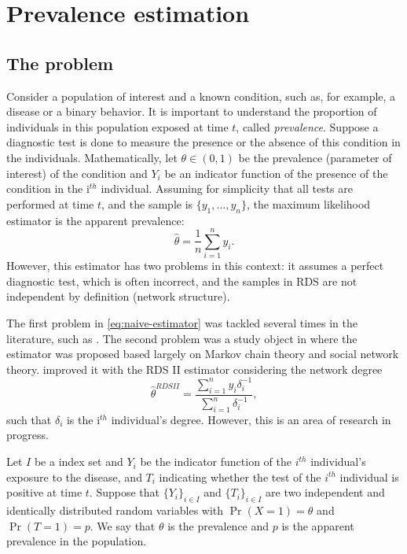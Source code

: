 \chapter{Prevalence estimation}

\section{The problem}

Consider a population of interest and a known condition, such as, for example,
a disease or a binary behavior. It is important to understand the proportion
of individuals in this population exposed at time $t$, called {\em
prevalence}. Suppose a diagnostic test is done to measure the presence or the
absence of this condition in the individuals. Mathematically, let $\theta \in
(0,1)$ be the prevalence (parameter of interest) of the condition and $Y_i$ be an indicator function of the presence of the condition in the i$^{th}$ individual.
Assuming for simplicity that all tests are performed at time $t$, and the
sample is $\{y_1, ..., y_n\}$, the maximum likelihood estimator is the
apparent prevalence: 
\begin{equation}
    \label{eq:naive-estimator}
    \hat{\theta} = \frac{1}{n}\sum_{i=1}^n y_i.
\end{equation}
However, this estimator has two problems in this context: it assumes a perfect
diagnostic test, which is often incorrect, and the samples in RDS are not
independent by definition (network structure). 

The first problem in \eqref{eq:naive-estimator} was tackled several times in
the literature, such as \cite{mcinturff2004modelling}. The second problem was a study object in \cite{heckathorn1997,heckathorn2002} where the estimator was proposed
based largely on Markov chain theory and social network theory.
\cite{volz2008probability} improved it with the RDS II estimator considering
the network degree
\begin{equation}
    \hat{\theta}^{RDS II} = \frac{\sum_{i=1}^n y_i \delta_i^{-1}}{\sum_{i=1}^n \delta_i^{-1}},
\end{equation}
such that $\delta_i$ is the i$^{th}$ individual's degree. However, this is an
area of research in progress. 

Let $I$ be a index set and $Y_i$ be the indicator function of the $i^{th}$ individual's exposure to the disease, and $T_i$
indicating whether the test of the $i^{th}$ individual is positive at time
$t$. Suppose that $\{Y_i\}_{i \in I}$ and $\{T_i\}_{i \in I}$ are two independent and identically distributed
random variables with $\Pr(X = 1) = \theta$ and $\Pr(T = 1) = p$. We say that
$\theta$ is the prevalence and $p$ is the apparent prevalence in the
population. 

